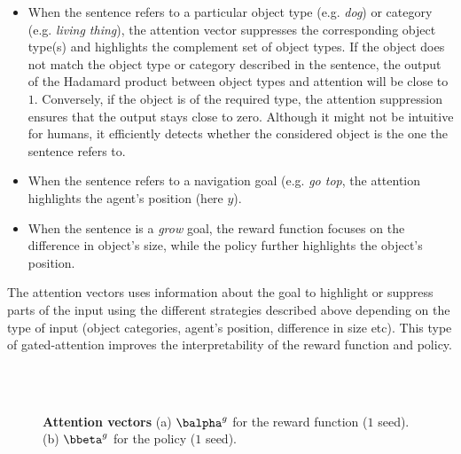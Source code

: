 \begin{itemize}
    \item When the sentence refers to a particular object type (e.g. \textit{dog}) or category (e.g. \textit{living thing}), the attention vector suppresses the corresponding object type(s) and highlights the complement set of object types. If the object does not match the object type or category described in the sentence, the output of the Hadamard product between object types and attention will be close to $1$. Conversely, if the object is of the required type, the attention suppression ensures that the output stays close to zero. Although it might not be intuitive for humans, it efficiently detects whether the considered object is the one the sentence refers to.
    \item When the sentence refers to a navigation goal (e.g. \textit{go top}, the attention highlights the agent's position (here $y$).
    \item When the sentence is a \textit{grow} goal, the reward function focuses on the difference in object's size, while the policy further highlights the object's position.
\end{itemize}
The attention vectors uses information about the goal to highlight or suppress parts of the input using the different strategies described above depending on the type of input (object categories, agent's position, difference in size etc). This type of gated-attention improves the interpretability of the reward function and policy. 

\begin{figure*}[!htbp]
  \centering
   \\
   \\
  \caption{\textbf{Attention vectors} (a) $\balpha^g$ for the reward function ($1$ seed). (b) $\bbeta^g$ for the policy ($1$ seed).}
  \label{fig:att}
\end{figure*}   

\clearpage
